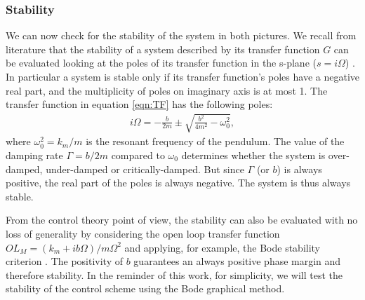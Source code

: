 \documentclass[%
 reprint,
 amsmath,amssymb,
 aps,
]{revtex4-1}
\begin{document}
\subsubsection*{Stability}
We can now check for the stability of the system in both pictures.
We recall from literature that the stability of a system described by its transfer function $G$ can be evaluated looking at the poles 
of its transfer function in the s-plane ($s=i\Omega$) \cite{Greensite70}. In particular a system is stable only if its transfer function's poles have
a negative real part,  and the multiplicity of poles on imaginary axis is at most 1.
The transfer function in equation \ref{eqn:TF} has the following poles:
\begin{eqnarray}
\label{eqn:poles}
i\Omega=-\frac{b}{2m}\pm\sqrt{\frac{b^2}{4m^2}-\omega_0^2},
\end{eqnarray}
where $\omega_0^2=k_m/m$ is the resonant frequency of the pendulum. 
The value of the damping rate $\Gamma=b/2m$ compared to $\omega_0$ determines whether the system is over-damped, under-damped or critically-damped. But since  $\Gamma$ (or $b$) is always positive, 
the real part of the poles is always negative. The system is thus always stable. 

From the control theory point of view, the stability can also be evaluated with no loss of generality by considering the open loop transfer function $OL_M= (k_m+ib\Omega)/m\Omega^2$ and applying, for example, the Bode stability criterion \cite{Franklin94}. The positivity of $b$ guarantees an always positive phase margin and therefore stability.
In the reminder of this work, for simplicity, we will test the stability of the control scheme using the Bode graphical method.
\end{document}
